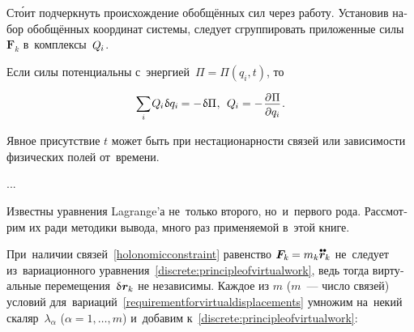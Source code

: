 \begin{otherlanguage}{russian}
\vspace{-0.15em} \noindent Ст\'{о}ит подчеркнуть происхождение обобщённых сил через работу. Установив набор обобщённых координат системы, следует сгруппировать приложенные силы~${\bm{F}_k}$ в~комплексы~${Q_{\hspace{-0.1ex}i}}$.

Если силы потенциальны с~энергией~${\Pi \!=\! \Pi(q_i, t)}$, то

\nopagebreak\vspace{-0.2em}\begin{equation}
\scalebox{0.92}[0.96]{$\displaystyle \sum_{i}$} \hspace{.16ex} Q_{\hspace{-0.1ex}i} \hspace{.12ex} \variation{q_i} \hspace{-0.1ex}
= - \hspace{.16ex} \variation{\Pi} \hspace{.1ex} ,
\:\:
Q_{\hspace{-0.1ex}i} = - \hspace{.16ex} \scalebox{0.96}{$ \displaystyle \frac{\raisemath{-0.12em}{\partial \hspace{.1ex} \Pi}}{\raisemath{-0.1em}{\partial q_i}} $} \hspace{.16ex} .
\vspace{-0.1em}\end{equation}

\vspace{-0.15em} \noindent Явное присутствие $t$ может быть при нестационарности связей или зависимости физических полей от~времени.

...

Известны уравнения Lagrange’а не~только второго, но~и~первого рода. Рассмотрим их ради методики вывода, много раз применяемой в~этой книге.

При~наличии связей~\eqref{holonomicconstraint} равенство ${\bm{F}_k \hspace{-0.12ex} = m_k \mathdotdotabove{\bm{r}}_k}$ не~следует из~вариационного уравнения~\eqref{discrete:principleofvirtualwork}, ведь тогда виртуальные перемещения~${\variation{\hspace{.1ex}\bm{r}_k}}$ не независимы. Каждое из $m$ ($m$~--- число связей) условий для~вариаций~\eqref{requirementforvirtualdisplacements} умножим на~некий скаляр~$\lambda_{\alpha}$ (${\alpha = 1, \ldots, m}$) и~добавим к~\eqref{discrete:principleofvirtualwork}:


\end{otherlanguage}
